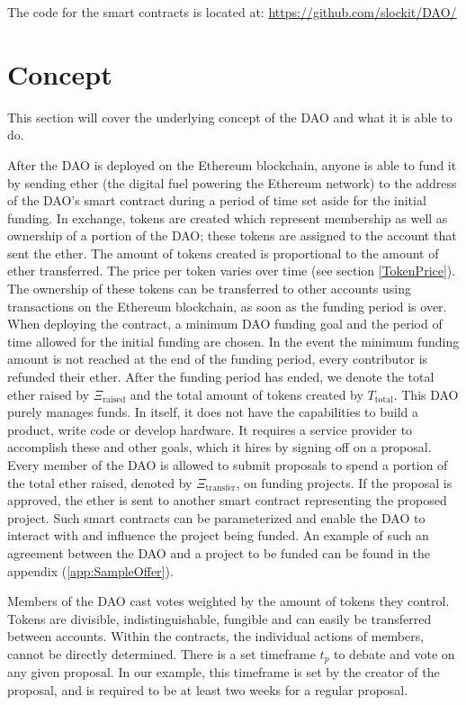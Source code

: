 \documentclass[9pt,oneside]{amsart}
\begin{document}
\begin{multicols}{2}
The code for the smart contracts is located at: \url{https://github.com/slockit/DAO/}


\section{Concept}
This section will cover the underlying concept of the DAO and what it is able to do.

After the DAO is deployed on the Ethereum blockchain, anyone is able to fund it by sending ether (the digital fuel powering the Ethereum network) to the address of the DAO’s smart contract during a period of time set aside for the initial funding. In exchange, tokens are created which represent membership as well as ownership of a portion of the DAO; these tokens are assigned to the account that sent the ether. The amount of tokens created is proportional to the amount of ether transferred. The price per token varies over time (see section \ref{TokenPrice}). The ownership of these tokens can be transferred to other accounts using transactions on the Ethereum blockchain, as soon as the funding period is over.
When deploying the contract, a minimum DAO funding goal and the period of time allowed for the initial funding are chosen. In the event the minimum funding amount is not reached at the end of the funding period, every contributor is refunded their ether. After the funding period has ended, we denote the total ether raised by $\Xi_{\text{raised}}$ and the total amount of tokens created by $T_{\text{total}}$. 
This DAO purely manages funds. In itself, it does not have the capabilities to build a product, write code or develop hardware. It requires a service provider to accomplish these and other goals, which it hires by signing off on a proposal. Every member of the DAO is allowed to submit proposals to spend a portion of the total ether raised, denoted by $\Xi_{\text{transfer}}$, on funding projects. If the proposal is approved, the ether is sent to another smart contract representing the proposed project. Such smart contracts can be parameterized and enable the DAO to interact with and influence the project being funded.
An example of such an agreement between the DAO and a project to be funded can be found in the appendix (\ref{app:SampleOffer}).

Members of the DAO cast votes weighted by the amount of tokens they control.  Tokens are divisible, indistinguishable, fungible and can easily be transferred between accounts. Within the contracts, the individual actions of members, cannot be directly determined. There is a set timeframe $t_p$ to debate and vote on any given proposal. In our example, this timeframe is set by the creator of the proposal, and is required to be at least two weeks for a regular proposal.


\end{multicols}
\end{document}
